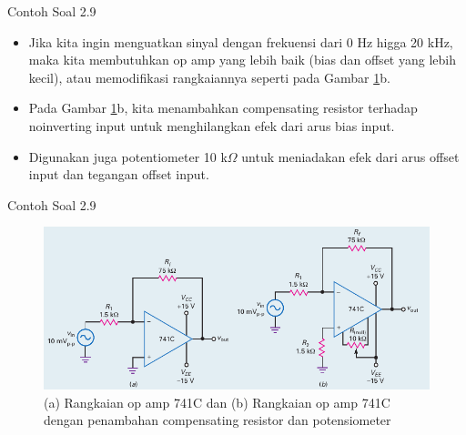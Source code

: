 \begin{frame}[t]{Contoh Soal 2.9}
	\begin{itemize}
		\item Jika kita ingin menguatkan sinyal dengan frekuensi dari 0 Hz higga 20 kHz, maka kita membutuhkan op amp yang lebih baik (bias dan offset yang lebih kecil), atau memodifikasi rangkaiannya seperti pada Gambar \ref{fig-16.17}b.
		\item Pada Gambar \ref{fig-16.17}b, kita menambahkan compensating resistor terhadap noinverting input untuk menghilangkan efek dari arus bias input.
		\item Digunakan juga potentiometer 10 k$\Omega$ untuk meniadakan efek dari arus offset input dan tegangan offset input.
	\end{itemize}
\end{frame}

\begin{frame}[t]{Contoh Soal 2.9}
	\begin{figure}
		\centering
		\includegraphics[width=0.8\linewidth]{gambar/fig-16.17}
		\caption{(a) Rangkaian op amp 741C dan (b) Rangkaian op amp 741C dengan penambahan compensating resistor dan potensiometer}
		\label{fig-16.17}
	\end{figure}
	
\end{frame}